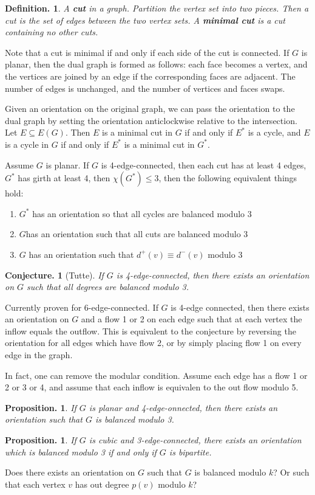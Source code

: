 \documentclass[11pt, a4paper]{memoir}
\theoremstyle{change}
\newtheorem{conjecture}[theorem]{Conjecture.}
\newtheorem{proposition}[theorem]{Proposition.}
\theoremstyle{plain}
\theoremstyle{nonumberplain}
\newtheorem{definition}{Definition.}
\numberwithin{equation}{section}
\begin{document}
\begin{definition}
    A \textbf{cut} in a graph.
    Partition the vertex set into two pieces.
    Then a cut is the set of edges between the two vertex sets.
    A \textbf{minimal cut} is a cut containing no other cuts.
\end{definition}
Note that a cut is minimal if and only if each side of the cut is connected.
If $G$ is planar, then the dual graph is formed as follows: each face becomes a vertex, and the vertices are joined by an edge if the corresponding faces are adjacent.
The number of edges is unchanged, and the number of vertices and faces swaps.

Given an orientation on the original graph, we can pass the orientation to the dual graph by setting the orientation anticlockwise relative to the intersection.
Let $E\subseteq E(G)$.
Then $E$ is a minimal cut in $G$ if and only if $E^*$ is a cycle, and $E$ is a cycle in $G$ if and only if $E^*$ is a minimal cut in $G^*$.

Assume $G$ is planar.
If $G$ is 4-edge-connected, then each cut has at least 4 edges, $G^*$ has girth at least 4, then $\chi(G^*)\leq 3$, then the following equivalent things hold:
\begin{enumerate}[nl,r]
    \item $G^*$ has an orientation so that all cycles are balanced modulo 3
    \item $G$has an orientation such that all cuts are balanced modulo 3
    \item $G$ has an orientation such that $d^+(v)\equiv d^-(v)$ modulo 3
\end{enumerate}
\begin{conjecture}[Tutte]
    If $G$ is 4-edge-connected, then there exists an orientation on $G$ such that all degrees are balanced modulo 3.
\end{conjecture}
Currently proven for 6-edge-connected.
If $G$ is 4-edge connected, then there exists an orientation on $G$ and a flow 1 or 2 on each edge such that at each vertex the inflow equals the outflow.
This is equivalent to the conjecture by reversing the orientation for all edges which have flow 2, or by simply placing flow 1 on every edge in the graph.

In fact, one can remove the modular condition.
Assume each edge has a flow 1 or 2 or 3 or 4, and assume that each inflow is equivalen to the out flow modulo 5.

\begin{proposition}
    If $G$ is planar and 4-edge-onnected, then there exists an orientation such that $G$ is balanced modulo 3.
\end{proposition}
\begin{proposition}
    If $G$ is cubic and 3-edge-connected, there exists an orientation which is balanced modulo 3 if and only if $G$ is bipartite.
\end{proposition}
Does there exists an orientation on $G$ such that $G$ is balanced modulo $k$?
Or such that each vertex $v$ has out degree $p(v)$ modulo $k$?
\end{document}

